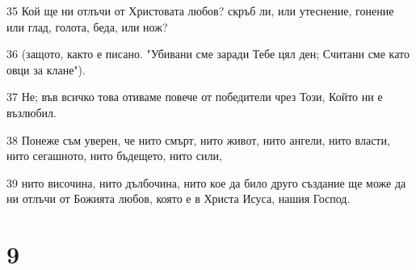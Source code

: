 \par 35 Кой ще ни отлъчи от Христовата любов? скръб ли, или утеснение, гонение или глад, голота, беда, или нож?
\par 36 (защото, както е писано. "Убивани сме заради Тебе цял ден; Считани сме като овци за клане").
\par 37 Не; във всичко това отиваме повече от победители чрез Този, Който ни е възлюбил.
\par 38 Понеже съм уверен, че нито смърт, нито живот, нито ангели, нито власти, нито сегашното, нито бъдещето, нито сили,
\par 39 нито височина, нито дълбочина, нито кое да било друго създание ще може да ни отлъчи от Божията любов, която е в Христа Исуса, нашия Господ.

\chapter{9}

